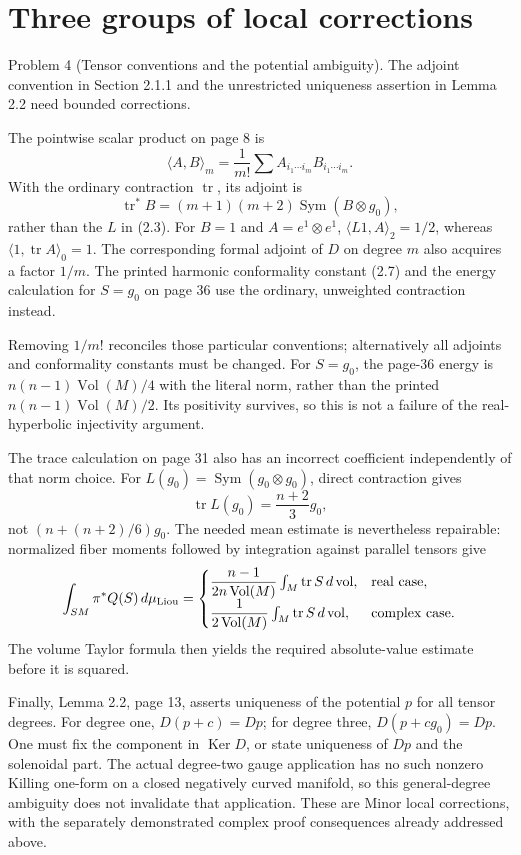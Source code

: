 \documentclass[10pt]{article}
\begin{document}
\section*{Three groups of local corrections}
Problem 4 (Tensor conventions and the potential ambiguity).  The adjoint convention in Section 2.1.1 and the unrestricted uniqueness assertion in Lemma 2.2 need bounded corrections.\par
The pointwise scalar product on page 8 is \[\langle A,B\rangle_m=\frac1{m!}\sum A_{i_1\cdots i_m}
                                          B_{i_1\cdots i_m}.\] With the ordinary contraction \(\operatorname{tr}\), its adjoint is \[\operatorname{tr}^*B=(m+1)(m+2)\operatorname{Sym}(B\otimes g_0),\] rather than the \(L\) in (2.3). For \(B=1\) and \(A=e^1\otimes e^1\), \(\langle L1,A\rangle_2=1/2\), whereas \(\langle1,\operatorname{tr}A\rangle_0=1\). The corresponding formal adjoint of \(D\) on degree \(m\) also acquires a factor \(1/m\). The printed harmonic conformality constant (2.7) and the energy calculation for \(S=g_0\) on page 36 use the ordinary, unweighted contraction instead.\par
Removing \(1/m!\) reconciles those particular conventions; alternatively all adjoints and conformality constants must be changed. For \(S=g_0\), the page-36 energy is \(n(n-1)\operatorname{Vol}(M)/4\) with the literal norm, rather than the printed \(n(n-1)\operatorname{Vol}(M)/2\). Its positivity survives, so this is not a failure of the real-hyperbolic injectivity argument.\par
The trace calculation on page 31 also has an incorrect coefficient independently of that norm choice. For \(L(g_0)=\operatorname{Sym}(g_0\otimes g_0)\), direct contraction gives \[\operatorname{tr}L(g_0)=\frac{n+2}{3}g_0,\] not \((n+(n+2)/6)g_0\). The needed mean estimate is nevertheless repairable: normalized fiber moments followed by integration against parallel tensors give \[\int_{SM}\pi^*Q(S)\,d\mu_{\rm Liou}
 =\begin{cases}
 \dfrac{n-1}{2n\operatorname{Vol}(M)}
                 \int_M\operatorname{tr}S\,d\operatorname{vol},&\text{real case},\\[4pt]
 \dfrac1{2\operatorname{Vol}(M)}
                 \int_M\operatorname{tr}S\,d\operatorname{vol},&\text{complex case}.
 \end{cases}\] The volume Taylor formula then yields the required absolute-value estimate before it is squared.\par
Finally, Lemma 2.2, page 13, asserts uniqueness of the potential \(p\) for all tensor degrees. For degree one, \(D(p+c)=Dp\); for degree three, \(D(p+c g_0)=Dp\). One must fix the component in \(\operatorname{Ker}D\), or state uniqueness of \(Dp\) and the solenoidal part. The actual degree-two gauge application has no such nonzero Killing one-form on a closed negatively curved manifold, so this general-degree ambiguity does not invalidate that application. These are Minor local corrections, with the separately demonstrated complex proof consequences already addressed above.\par
\end{document}
